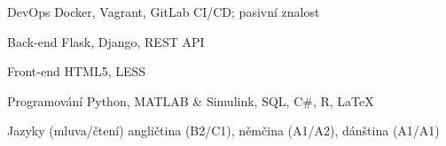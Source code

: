 

\begin{cvskills}

  \cvskill
    {DevOps} %
    {Docker, Vagrant, GitLab CI/CD; pasivní znalost} %

  \cvskill
    {Back-end} %
    {Flask, Django, REST API} %

  \cvskill
    {Front-end} %
    {HTML5, LESS} %

  \cvskill
    {Programování} %
    {Python, MATLAB \& Simulink, SQL, C\#, R, LaTeX} %

  \cvskill
    {Jazyky (mluva/čtení)} %
    {angličtina (B2/C1), němčina (A1/A2), dánština (A1/A1)} %

\end{cvskills}
